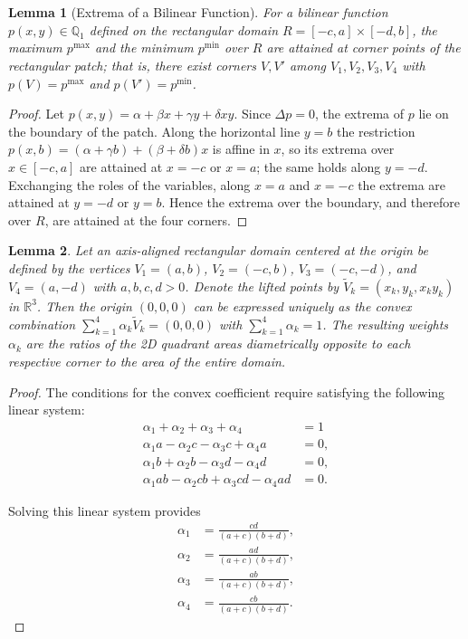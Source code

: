 \documentclass[a4paper]{article}
\newcommand{\R}{\mathbb{R}}
\theoremstyle{plain}
\newtheorem{lemma}{Lemma}
\theoremstyle{definition}
\theoremstyle{remark}
\begin{document}
\begin{lemma}[Extrema of a Bilinear Function]\label{lem:extrema}
	For a bilinear function $p(x,y) \in \mathbb{Q}_1$ defined on the rectangular domain $R = [-c, a] \times [-d, b]$, the maximum $p^{\max}$ and the minimum $p^{\min}$ over $R$ are attained at corner points of the rectangular patch; that is, there exist corners $V, V'$ among $V_1, V_2, V_3, V_4$ with $p(V) = p^{\max}$ and $p(V') = p^{\min}$.
\end{lemma}

\begin{proof}
	Let $p(x,y) = \alpha + \beta x + \gamma y + \delta xy$. Since $\Delta p = 0$, the extrema of $p$ lie on the boundary of the patch. Along the horizontal line $y = b$ the restriction $p(x,b) = (\alpha + \gamma b) + (\beta + \delta b)x$ is affine in $x$, so its extrema over $x \in [-c,a]$ are attained at $x = -c$ or $x = a$; the same holds along $y = -d$. Exchanging the roles of the variables, along $x = a$ and $x = -c$ the extrema are attained at $y = -d$ or $y = b$. Hence the extrema over the boundary, and therefore over $R$, are attained at the four corners.
\end{proof}
\begin{lemma}
	Let an axis-aligned rectangular domain centered at the origin be defined by the vertices $V_1=(a,b)$, $V_2=(-c,b)$, $V_3=(-c,-d)$, and $V_4=(a,-d)$ with $a,b,c,d > 0$. Denote the lifted points by $\tilde{V}_k = (x_k, y_k, x_k y_k)$ in $\R^3$. Then the origin $(0,0,0)$ can be expressed uniquely as the convex combination $\sum_{k=1}^{4} \alpha_k \tilde{V}_k = (0,0,0)$ with $\sum_{k=1}^{4} \alpha_k = 1$. The resulting weights $\alpha_k$ are  the ratios of the 2D quadrant areas diametrically opposite to each respective corner to the area of the entire domain.
	\label{lem:explicit_weight_2D}
\end{lemma}

\begin{proof}
	The conditions for the convex coefficient require satisfying the following linear system:
	\begin{align*}
		\alpha_1 + \alpha_2 + \alpha_3 + \alpha_4 &= 1  \\
		\alpha_1 a - \alpha_2 c - \alpha_3 c + \alpha_4 a &= 0, \\
		\alpha_1 b + \alpha_2 b - \alpha_3 d - \alpha_4 d &= 0 , \\
		\alpha_1 ab - \alpha_2 cb + \alpha_3 cd - \alpha_4 ad &= 0 .
	\end{align*}
	
	Solving this linear system provides
	\begin{align}
		\alpha_1  &= \frac{cd}{(a+c)(b+d)} \label{alpha_f}, \\
		\alpha_2  &= \frac{ad}{(a+c)(b+d)}, \\
		\alpha_3  &= \frac{ab}{(a+c)(b+d)}, \\
		\alpha_4  &= \frac{cb}{(a+c)(b+d)}.\label{alpha_l}
	\end{align}
	
\end{proof}
\end{document}
